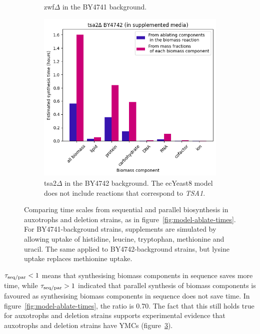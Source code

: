\begin{figure}
\begin{subfigure}[htpb]{0.45\textwidth}
   \caption{
     zwf$\Delta$ in the BY4741 background.
   }
   \label{fig:model-ablation-zwf1}
  \end{subfigure}
  \begin{subfigure}[htpb]{0.45\textwidth}
   \centering
   \includegraphics[width=\textwidth]{ablation_tsa2}
   \caption{
     tsa2$\Delta$ in the BY4742 background.  The ecYeast8 model does not include reactions that correspond to \textit{TSA1}.
   }
   \label{fig:model-ablation-tsa2}
  \end{subfigure}
  \caption{
    Comparing time scales from sequential and parallel biosynthesis in auxotrophs and deletion strains, as in figure~\ref{fig:model-ablate-times}.
    For BY4741-background strains, supplements are simulated by allowing uptake of histidine, leucine, tryptophan, methionine and uracil.
    The same applied to BY4742-background strains, but lysine uptake replaces methionine uptake.
  }
  \label{fig:model-ablation-strains}
\end{figure}

$\tau_{\mathrm{seq}/\mathrm{par}} < 1$ means that synthesising biomass components in sequence saves more time, while $\tau_{\mathrm{seq}/\mathrm{par}} > 1$ indicated that parallel synthesis of biomass components is favoured as synthesising biomass components in sequence does not save time.
In figure~\ref{fig:model-ablate-times}, the ratio is 0.70.
The fact that this still holds true for auxotrophs and deletion strains supports experimental evidence that auxotrophs and deletion strains have YMCs (figure~\ref{fig:model-ablation-strains}).

